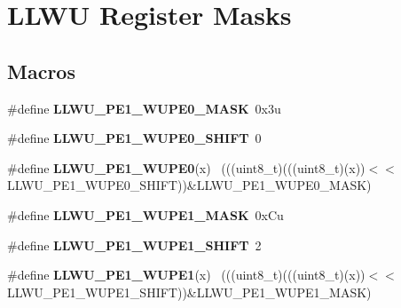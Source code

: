 \hypertarget{group___l_l_w_u___register___masks}{}\section{L\+L\+W\+U Register Masks}
\label{group___l_l_w_u___register___masks}
\subsection*{Macros}
\begin{DoxyCompactItemize}
\item 
\hypertarget{group___l_l_w_u___register___masks_ga6ed6c56a8797caa64d27eb915c164dad}{}\#define {\bfseries L\+L\+W\+U\+\_\+\+P\+E1\+\_\+\+W\+U\+P\+E0\+\_\+\+M\+A\+S\+K}~0x3u\label{group___l_l_w_u___register___masks_ga6ed6c56a8797caa64d27eb915c164dad}

\item 
\hypertarget{group___l_l_w_u___register___masks_ga234c02ee9c2b3e3e248c90473e922336}{}\#define {\bfseries L\+L\+W\+U\+\_\+\+P\+E1\+\_\+\+W\+U\+P\+E0\+\_\+\+S\+H\+I\+F\+T}~0\label{group___l_l_w_u___register___masks_ga234c02ee9c2b3e3e248c90473e922336}

\item 
\hypertarget{group___l_l_w_u___register___masks_gad0111a325ce3f549a1726373cde88f96}{}\#define {\bfseries L\+L\+W\+U\+\_\+\+P\+E1\+\_\+\+W\+U\+P\+E0}(x)                                            ~(((uint8\+\_\+t)(((uint8\+\_\+t)(x))$<$$<$L\+L\+W\+U\+\_\+\+P\+E1\+\_\+\+W\+U\+P\+E0\+\_\+\+S\+H\+I\+F\+T))\&L\+L\+W\+U\+\_\+\+P\+E1\+\_\+\+W\+U\+P\+E0\+\_\+\+M\+A\+S\+K)\label{group___l_l_w_u___register___masks_gad0111a325ce3f549a1726373cde88f96}

\item 
\hypertarget{group___l_l_w_u___register___masks_gac0c417f78992f2ebaca7267ef06d888a}{}\#define {\bfseries L\+L\+W\+U\+\_\+\+P\+E1\+\_\+\+W\+U\+P\+E1\+\_\+\+M\+A\+S\+K}~0x\+Cu\label{group___l_l_w_u___register___masks_gac0c417f78992f2ebaca7267ef06d888a}

\item 
\hypertarget{group___l_l_w_u___register___masks_gaa9b8224f389f9c3d4f13772d8e5fbeee}{}\#define {\bfseries L\+L\+W\+U\+\_\+\+P\+E1\+\_\+\+W\+U\+P\+E1\+\_\+\+S\+H\+I\+F\+T}~2\label{group___l_l_w_u___register___masks_gaa9b8224f389f9c3d4f13772d8e5fbeee}

\item 
\hypertarget{group___l_l_w_u___register___masks_ga51ac5ef18e9ddf78bd29e79575408a00}{}\#define {\bfseries L\+L\+W\+U\+\_\+\+P\+E1\+\_\+\+W\+U\+P\+E1}(x)                                            ~(((uint8\+\_\+t)(((uint8\+\_\+t)(x))$<$$<$L\+L\+W\+U\+\_\+\+P\+E1\+\_\+\+W\+U\+P\+E1\+\_\+\+S\+H\+I\+F\+T))\&L\+L\+W\+U\+\_\+\+P\+E1\+\_\+\+W\+U\+P\+E1\+\_\+\+M\+A\+S\+K)\label{group___l_l_w_u___register___masks_ga51ac5ef18e9ddf78bd29e79575408a00}


\end{DoxyCompactItemize}
